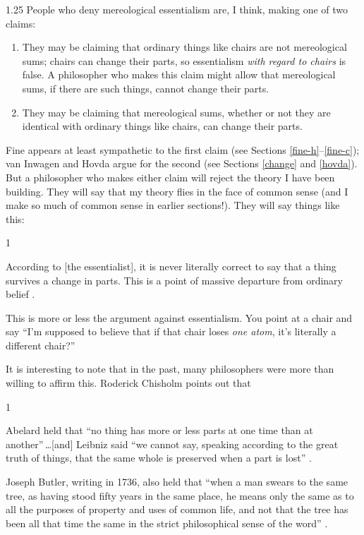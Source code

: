 \documentclass[12pt,twoside]{reedfancy}
\newenvironment{squote}{%
	\begin{spacing}{1}
	\begin{list}{}{%
	\setlength{\labelwidth}{0pt}%
	\rightmargin\leftmargin%
	}
	\item\relax
	}{%
	\end{list}%
	\end{spacing}
	}
\begin{document}
\begin{spacing}{1.25}
People who deny mereological essentialism are, I think, making one of
two claims:

\begin{enumerate}
  \item They may be claiming that ordinary things like chairs are not
    mereological sums; chairs can change their parts, so essentialism
    {\em with regard to chairs} is false.  A philosopher who makes
    this claim might allow that mereological sums, if there are such
    things, cannot change their parts.
  \item They may be claiming that mereological sums, whether or not
    they are identical with ordinary things like chairs, can change
    their parts.
\end{enumerate}

Fine appears at least sympathetic to the first claim (see Sections
\ref{fine-h}--\ref{fine-c}); van Inwagen and Hovda argue for the
second (see Sections \ref{change} and \ref{hovda}).  But a philosopher
who makes either claim will reject the theory I have been building.
They will say that my theory flies in the face of common sense (and I
make so much of common sense in earlier sections!).  They will say
things like this:

\begin{squote}
According to [the essentialist], it is never literally correct to say
that a thing survives a change in parts.  This is a point of massive
departure from ordinary belief \citep[184]{sider2001}.
\end{squote}

This is more or less the argument against essentialism.  You point at
a chair and say ``I'm supposed to believe that if that chair loses
{\em one atom}, it's literally a different chair?''

It is interesting to note that in the past, many philosophers were
more than willing to affirm this.  Roderick Chisholm points out that

\begin{squote}
Abelard held that ``no thing has more or less parts at one time than
at another''\,\ldots [and] Leibniz said ``we cannot say, speaking
according to the great truth of things, that the same whole is
preserved when a part is lost'' \citeyearpar[145]{chisholm1979}.
\end{squote}

Joseph Butler, writing in 1736, also held that ``when a man swears to
the same tree, as having stood fifty years in the same place, he means
only the same as to all the purposes of property and uses of common
life, and not that the tree has been all that time the same in the
strict philosophical sense of the word''
\citeyearpar[100]{butler1975a}.


\end{spacing}
\end{document}
